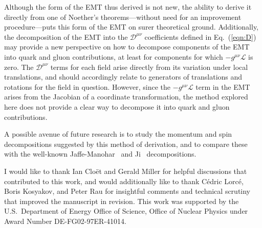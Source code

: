 \documentclass[prd,preprint,
  showpacs,showkeys,lengthcheck,
  nofootinbib,tightenlines,onecolumn,notitlepage,
  preprintnumbers,superscriptaddress]{revtex4-1}
\newcommand{\Lag}{\ensuremath{\mathscr{L}}}
\begin{document}
Although the form of the EMT thus derived is not new,
the ability to derive it directly from one of Noether's theorems---without
need for an improvement procedure---puts this form of the EMT
on surer theoretical ground.
Additionally, the decomposition of the EMT into the
$\mathscr{D}^{\mu\nu}$ coefficients defined in Eq.~(\ref{eqn:D})
may provide a new perspective on how to decompose components of the EMT
into quark and gluon contributions, at least for components for which
$-g^{\mu\nu}\Lag$ is zero.
The $\mathscr{D}^{\mu\nu}$ terms for each field arise directly from its
variation under local translations,
and should accordingly relate to generators of translations and rotations
for the field in question.
However, since the $-g^{\mu\nu}\Lag$ term in the EMT arises from the Jacobian
of a coordinate transformation, the method explored here does not provide
a clear way to decompose it into quark and gluon contributions.

A possible avenue of future research is to study the momentum and spin
decompositions suggested by this method of derivation,
and to compare these with the well-known Jaffe-Manohar~\cite{Jaffe:1989jz}
and Ji~\cite{Ji:1996ek} decompositions.


\begin{acknowledgments}
  I would like to thank
  Ian Clo\"et and Gerald Miller
  for helpful discussions that contributed to this work,
  and would additionally like to thank C\'edric Lorc\'e,
  Boris Kosyakov, and Peter Rau
  for insightful comments and technical scrutiny that
  improved the manuscript in revision.
  This work was supported by the U.S.\ Department of Energy
  Office of Science, Office of Nuclear Physics under Award Number
  DE-FG02-97ER-41014.
\end{acknowledgments}




\end{document}
